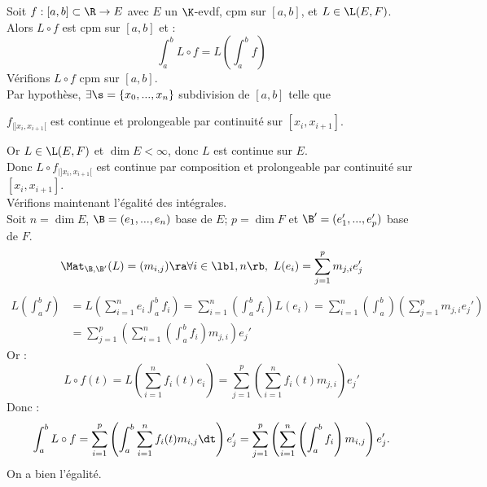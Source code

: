 \documentclass[11pt]{article}
\begin{document}
\begin{thm}{}{}
    Soit $f:[a,b]\subset\R\to E$ avec $E$ un $\K$-evdf, cpm sur $[a,b]$, et $L\in\L(E,F)$. Alors $L\circ f$ est cpm sur $[a,b]$ et :
    \begin{equation*}
        \int_a^b L\circ f = L\left( \int_a^b f \right)
    \end{equation*} 
    \tcblower
    Vérifions $L\circ f$ cpm sur $[a,b]$.\\
    Par hypothèse, $\exists \s=\{x_0,...,x_n\}$ subdivision de $[a,b]$ telle que
    \begin{center}
        $f_{|]x_i,x_{i+1}[}$ est continue et prolongeable par continuité sur $[x_i,x_{i+1}]$.
    \end{center}
    Or $L\in\L(E,F)$ et $\dim E < \infty$, donc $L$ est continue sur $E$.\\
    Donc $L\circ f_{|]x_i,x_{i+1}[}$ est continue par composition et prolongeable par continuité sur $[x_i,x_{i+1}]$.\\
    Vérifions maintenant l'égalité des intégrales.\\
    Soit $n=\dim E$, $\B=(e_1,...,e_n)$ base de $E$; $p=\dim F$ et $\B'=(e_1',...,e_p')$ base de $F$.
    \begin{equation*}
        \Mat_{\B,\B'}(L) = (m_{i,j}) \ra \forall i \in \lb1,n\rb, ~ L(e_i) = \sum_{j=1}^p m_{j,i}e_j'
    \end{equation*}
    \begin{align*}
        L\left( \int_a^b f \right) &= L\left( \sum_{i=1}^n e_i \int_a^b f_i \right) = \sum_{i=1}^n\left( \int_a^b f_i \right)L(e_i) = \sum_{i=1}^n \left( \int_a^b \right)\left( \sum_{j=1}^p m_{j,i}e_j' \right)\\
        &= \sum_{j=1}^p\left( \sum_{i=1}^n \left( \int_a^b  f_i\right) m_{j,i} \right)e_j'
    \end{align*}
    Or :
    \begin{equation*}
        L\circ f(t) = L\left( \sum_{i=1}^n f_i(t)e_i \right) = \sum_{j=1}^p\left( \sum_{i=1}^n f_i(t) m_{j,i} \right)e_j'
    \end{equation*}
    Donc :
    \begin{equation*}
        \int_a^b L\circ f = \sum_{i=1}^p\left( \int_a^b \sum_{i=1}^n f_i(t) m_{i,j}\dt \right)e_j' = \sum_{j=1}^p\left( \sum_{i=1}^n \left( \int_a^b f_i\right)m_{i,j} \right)e_j'.
    \end{equation*}
    On a bien l'égalité.
\end{thm}
\end{document}
